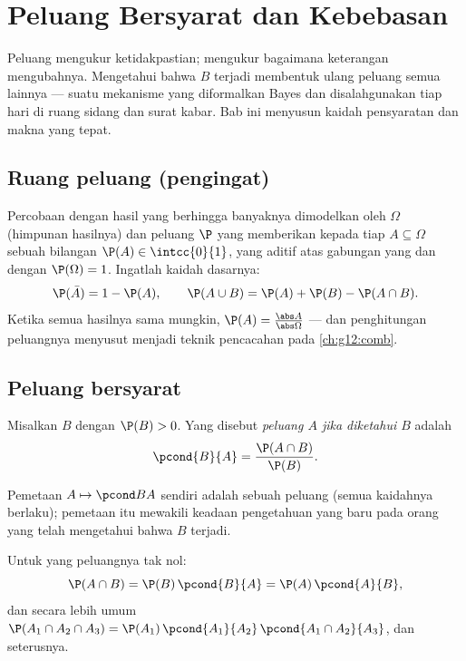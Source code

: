 \chapter{Peluang Bersyarat dan Kebebasan}\label{ch:g12:condprob}

Peluang mengukur ketidakpastian;  mengukur bagaimana
keterangan mengubahnya. Mengetahui bahwa  $B$ terjadi membentuk ulang
peluang semua  lainnya --- suatu mekanisme yang diformalkan Bayes dan
disalahgunakan tiap hari di ruang sidang dan surat kabar. Bab ini menyusun kaidah
pensyaratan dan makna  yang tepat.

\section{Ruang peluang (pengingat)}

Percobaan dengan hasil yang berhingga banyaknya dimodelkan oleh \emph{} $\Omega$ (himpunan hasilnya) dan peluang $\P$ yang memberikan kepada
tiap  $A \subseteq \Omega$ sebuah bilangan $\P(A) \in \intcc{0}{1}$, yang
aditif atas gabungan yang  dan dengan $\P(\Omega) = 1$. Ingatlah kaidah dasarnya:
\[
\P(\bar A) = 1 - \P(A),
\qquad
\P(A \cup B) = \P(A) + \P(B) - \P(A \cap B).
\]
Ketika semua hasilnya sama mungkin,
$\P(A) = \frac{\abs A}{\abs\Omega}$ --- dan penghitungan peluangnya menyusut
menjadi teknik pencacahan pada \cref{ch:g12:comb}.

\section{Peluang bersyarat}

\begin{definition}\label{def:g12:condprob:cond}
Misalkan $B$  dengan $\P(B) > 0$. Yang disebut \emph{peluang $A$ jika
diketahui $B$} adalah
\[
\pcond{B}{A} = \frac{\P(A \cap B)}{\P(B)} .
\]
\end{definition}

Pemetaan $A \mapsto \pcond BA$ sendiri adalah sebuah peluang (semua kaidahnya
berlaku); pemetaan itu mewakili keadaan pengetahuan yang baru pada orang yang telah
mengetahui bahwa $B$ terjadi.

\begin{proposition}\label{prop:g12:condprob:product}
Untuk  yang peluangnya tak nol:
\[
\P(A \cap B) = \P(B)\,\pcond{B}{A} = \P(A)\,\pcond{A}{B},
\]
dan secara lebih umum
$\P(A_1 \cap A_2 \cap A_3) = \P(A_1)\,\pcond{A_1}{A_2}\,
\pcond{A_1 \cap A_2}{A_3}$, dan seterusnya.
\end{proposition}

